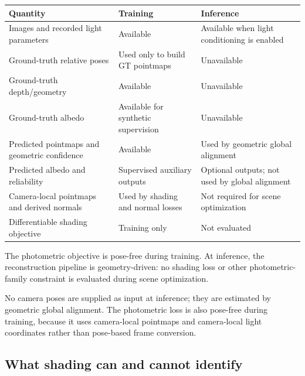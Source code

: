\documentclass[11pt,a4paper]{article}
\begin{document}
\begin{center}
\begin{tabularx}{\textwidth}{>{\raggedright\arraybackslash}p{}XX}
\toprule
Quantity & Training & Inference\\
\midrule
Images and recorded light parameters & Available & Available when light conditioning is enabled\\
Ground-truth relative poses & Used only to build GT pointmaps & Unavailable\\
Ground-truth depth/geometry & Available & Unavailable\\
Ground-truth albedo & Available for synthetic supervision & Unavailable\\
Predicted pointmaps and geometric confidence & Available & Used by geometric global alignment\\
Predicted albedo and reliability & Supervised auxiliary outputs & Optional outputs; not used by global alignment\\
Camera-local pointmaps and derived normals & Used by shading and normal losses & Not required for scene optimization\\
Differentiable shading objective & Training only & Not evaluated\\
\bottomrule
\end{tabularx}
\end{center}

The photometric objective is pose-free during training. At inference, the
reconstruction pipeline is geometry-driven: no shading loss or other
photometric-family constraint is evaluated during scene optimization.

No camera poses are supplied as input at inference; they are estimated by
geometric global alignment. The photometric loss is also pose-free during
training, because it uses camera-local pointmaps and camera-local light
coordinates rather than pose-based frame conversion.

\subsection{What shading can and cannot identify}
\label{sec:ident}
\end{document}
